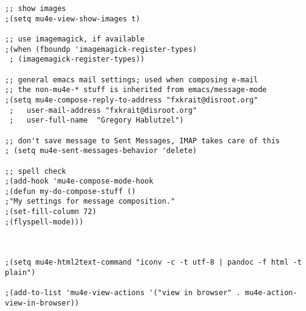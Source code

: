 \documentclass[11pt]{article}
\begin{document}
\begin{verbatim}
;; show images
;(setq mu4e-view-show-images t)

;; use imagemagick, if available
;(when (fboundp 'imagemagick-register-types)
 ; (imagemagick-register-types))

;; general emacs mail settings; used when composing e-mail
;; the non-mu4e-* stuff is inherited from emacs/message-mode
;(setq mu4e-compose-reply-to-address "fxkrait@disroot.org"
 ;   user-mail-address "fxkrait@disroot.org"
 ;   user-full-name  "Gregory Hablutzel")

;; don't save message to Sent Messages, IMAP takes care of this
; (setq mu4e-sent-messages-behavior 'delete)

;; spell check
;(add-hook 'mu4e-compose-mode-hook
;(defun my-do-compose-stuff ()
;"My settings for message composition."
;(set-fill-column 72)
;(flyspell-mode)))



;(setq mu4e-html2text-command "iconv -c -t utf-8 | pandoc -f html -t plain")

;(add-to-list 'mu4e-view-actions '("view in browser" . mu4e-action-view-in-browser))

\end{verbatim}
\end{document}
